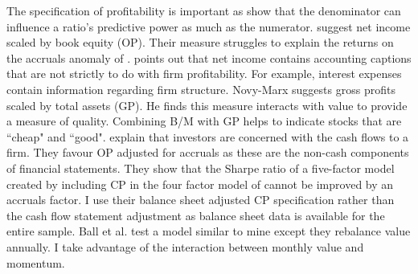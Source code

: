 The specification of profitability is important as \textcite{ball2015deflating}
show that the denominator can influence a ratio's predictive power as much as
the numerator. \textcite{fama2006profitability} suggest net income scaled by
book equity (OP). Their measure struggles to explain the returns on the
accruals anomaly of \textcite{sloan1996stock}. \textcite{novy2013other} points
out that net income contains accounting captions that are not strictly to do
with firm profitability. For example, interest expenses contain information
regarding firm structure. Novy-Marx suggests gross profits scaled by total
assets (GP). He finds this measure interacts with value to provide a measure of
quality. Combining B/M with GP helps to indicate stocks that are ``cheap" and
``good". \textcite{ball2016accruals} explain that investors are concerned with
the cash flows to a firm. They favour OP adjusted for accruals as these are the
non-cash components of financial statements. They show that the Sharpe ratio of
a five-factor model created by including CP in the four factor model of
\textcite{carhart1997persistence} cannot be improved by an accruals factor. I
use their balance sheet adjusted CP specification rather than the cash flow
statement adjustment as balance sheet data is available for the entire sample.
Ball et al. test a model similar to mine except they rebalance value annually.
I take advantage of the interaction between monthly value and momentum.

